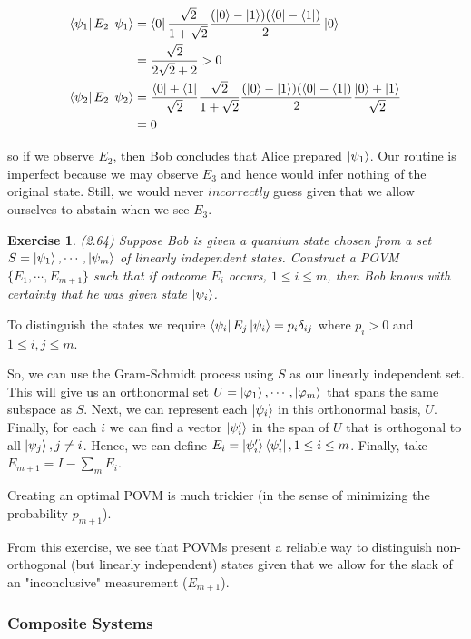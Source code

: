 \documentclass[11pt]{article}
\newcommand\0{\mathbf{0}}
\newcommand\<{\langle}
\renewcommand\>{\rangle}
\renewcommand\phi{\varphi}
\newtheorem{exercise}[theorem]{Exercise}
\begin{document}
\begin{align*}
\bra{\psi_1} E_2 \ket{\psi_1} &= \bra{0} \frac{\sqrt{2}}{1+\sqrt{2}}\frac{(\ket{0} - \ket{1})(\bra{0} - \bra{1})}{2}\ket{0} \\
	&= \frac{\sqrt{2}}{2\sqrt{2} + 2} > 0 \\
\bra{\psi_2} E_2 \ket{\psi_2} &= \frac{\bra{0} + \bra{1}}{\sqrt{2}}\frac{\sqrt{2}}{1+\sqrt{2}}\frac{(\ket{0} - \ket{1})(\bra{0} - \bra{1})}{2}\frac{\ket{0} + \ket{1}}{\sqrt{2}} \\
	&= 0
\end{align*}

so if we observe $E_2$, then Bob concludes that Alice prepared $\ket{\psi_1}$. Our routine is imperfect because we may observe $E_3$ and hence would infer nothing of the original state. Still, we would never $\textit{incorrectly}$ guess given that we allow ourselves to abstain when we see $E_3$. 

\begin{exercise} (2.64) Suppose Bob is given a quantum state chosen from a set $S = \ket{\psi_1} , \cdots , \ket{\psi_m}$ of linearly independent states. Construct a POVM $\{ E_1 , \cdots , E_{m+1} \}$ such that if outcome $E_i$ occurs, $1 \leq i \leq m$, then Bob knows with certainty that he was given state $\ket{\psi_i}$.
\end{exercise}

To distinguish the states we require $\bra{\psi_i} E_j \ket{\psi_i} = p_i \delta_{ij}$ where $p_i > 0$ and $1 \leq i,j \leq m$. 

So, we can use the Gram-Schmidt process using $S$ as our linearly independent set. This will give us an orthonormal set $U = \ket{\phi_1} , \cdots , \ket{\phi_m}$ that spans the same subspace as $S$. Next, we can represent each $\ket{\psi_i}$ in this orthonormal basis, $U$. Finally, for each $i$ we can find a vector $\ket{\psi'_i}$ in the span of $U$ that is orthogonal to all $\ket{\psi_j}, j \neq i$. Hence, we can define $E_i = \ket{\psi_i'} \bra{\psi_i'}, 1 \leq i \leq m$. Finally, take $E_{m+1} = I - \sum_m E_i$. 

Creating an optimal POVM is much trickier (in the sense of minimizing the probability $p_{m+1}$).

From this exercise, we see that POVMs present a reliable way to distinguish non-orthogonal (but linearly independent) states given that we allow for the slack of an "inconclusive" measurement ($E_{m+1}$). 

\subsubsection{Composite Systems}
\end{document}
